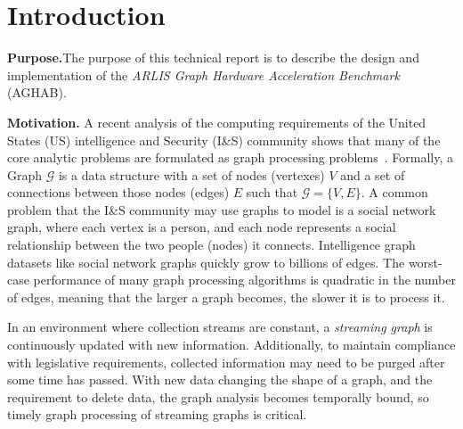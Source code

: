 \section{Introduction}\label{section:introduction}

\par{
    \textbf{Purpose.}The purpose of this technical report is to describe the design and implementation of the \textit{ARLIS Graph Hardware Acceleration Benchmark} (AGHAB).
}

\par{\textbf{Motivation.} A recent analysis of the computing requirements of the United States (US) intelligence and Security (I\&S) community shows that many of the core analytic problems are formulated as graph processing problems~\cite{Regli2022a}.
Formally, a Graph $\mathcal{G}$ is a data structure with a set of nodes (vertexes) $V$ and a set of connections between those nodes (edges) $E$ such that $\mathcal{G} = \{V,E\}$.
A common problem that the I\&S community may use graphs to model is a social network graph, where each vertex is a person, and each node represents a social relationship between the two people (nodes) it connects.
Intelligence graph datasets like social network graphs quickly grow to billions of edges. 
The worst-case performance of many graph processing algorithms is quadratic in the number of edges, meaning that the larger a graph becomes, the slower it is to process it. 

In an environment where collection streams are constant, a \textit{streaming graph} is continuously updated with new information.
Additionally, to maintain compliance with legislative requirements, collected information may need to be purged after some time has passed.
With new data changing the shape of a graph, and the requirement to delete data, the graph analysis becomes temporally bound, so timely graph processing of streaming graphs is critical. 

}
